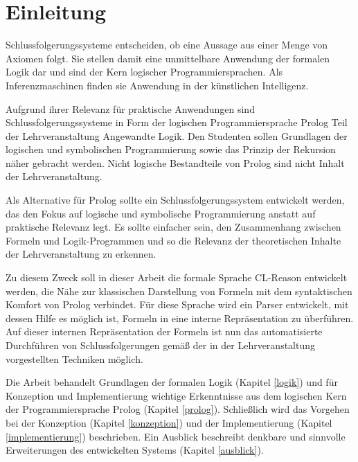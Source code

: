 \chapter{Einleitung}
Schlussfolgerungssysteme entscheiden, ob eine Aussage aus einer Menge von Axiomen folgt. Sie stellen damit eine unmittelbare Anwendung der formalen Logik dar und sind der Kern logischer Programmiersprachen. Als Inferenzmaschinen finden sie Anwendung in der künstlichen Intelligenz.

Aufgrund ihrer Relevanz für praktische Anwendungen sind Schlussfolgerungssysteme in Form der logischen Programmiersprache Prolog Teil der Lehrveranstaltung Angewandte Logik. Den Studenten sollen Grundlagen der logischen und symbolischen Programmierung sowie das Prinzip der Rekursion näher gebracht werden. Nicht logische Bestandteile von Prolog sind nicht Inhalt der Lehrveranstaltung.

Als Alternative für Prolog sollte ein Schlussfolgerungssystem entwickelt werden, das den Fokus auf logische und symbolische Programmierung anstatt auf praktische Relevanz legt. Es sollte einfacher sein, den Zusammenhang zwischen Formeln und Logik-Programmen und so die Relevanz der theoretischen Inhalte der Lehrveranstaltung zu erkennen.

Zu diesem Zweck soll in dieser Arbeit die formale Sprache CL-Reason entwickelt werden, die Nähe zur klassischen Darstellung von Formeln mit dem syntaktischen Komfort von Prolog verbindet. Für diese Sprache wird ein Parser entwickelt, mit dessen Hilfe es möglich ist, Formeln in eine interne Repräsentation zu überführen. Auf dieser internen Repräsentation der Formeln ist nun das automatisierte Durchführen von Schlussfolgerungen gemäß der in der Lehrveranstaltung vorgestellten Techniken möglich.

Die Arbeit behandelt Grundlagen der formalen Logik (Kapitel \ref{logik}) und für Konzeption und Implementierung wichtige Erkenntnisse aus dem logischen Kern der Programmiersprache Prolog (Kapitel \ref{prolog}). Schließlich wird das Vorgehen bei der Konzeption (Kapitel \ref{konzeption}) und der Implementierung (Kapitel \ref{implementierung}) beschrieben. Ein Ausblick beschreibt denkbare und sinnvolle Erweiterungen des entwickelten Systems (Kapitel \ref{ausblick}).
